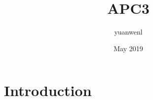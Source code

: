 \documentclass{article}
\title{APC3}
\author{yuanwenl }
\date{May 2019}
\begin{document}
\maketitle

\section{Introduction}
\end{document}
